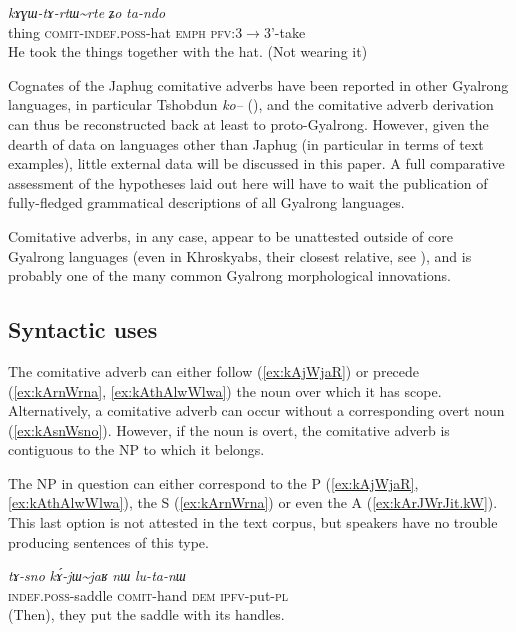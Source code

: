\documentclass[oldfontcommands,oneside,a4paper,11pt]{article}
\newcommand{\ipa}[1]{{\phon\textit{#1}}} %
\newcommand{\tld}{\textasciitilde{}}
\begin{document}
\begin{exe}
\ex \label{ex:kAGWtArtWrte}
\gll  \ipa{laχtɕha} 	\ipa{kɤɣɯ-tɤ-rtɯ\tld{}rte} 	\ipa{ʑo} 	\ipa{ta-ndo}  \\
thing \textsc{comit-indef.poss}-hat \textsc{emph} \textsc{pfv}:3$\rightarrow$3'-take \\
\glt He took the things together with the hat. (Not wearing it)
\end{exe}

Cognates of the Japhug comitative adverbs have been reported in other Gyalrong languages, in particular Tshobdun \ipa{ko--} (\citealt[107]{jackson98morphology}), and the comitative adverb derivation can thus be reconstructed back at least to proto-Gyalrong. However, given the dearth of data on languages other than Japhug (in particular in terms of text examples), little external data will be discussed in this paper. A full comparative assessment of the hypotheses laid out here will have to wait the publication of fully-fledged grammatical descriptions of all Gyalrong languages. 

Comitative adverbs, in any case, appear to be unattested outside of core Gyalrong languages (even in Khroskyabs, their closest relative, see \citealt{lai13affixale}), and is probably one of the many common Gyalrong  morphological innovations.

\subsection{Syntactic uses} 

The comitative adverb can either follow (\ref{ex:kAjWjaR}) or precede (\ref{ex:kArnWrna}, \ref{ex:kAthAlwWlwa}) the noun over which it has scope. Alternatively, a comitative adverb can occur without a corresponding overt noun (\ref{ex:kAsnWsno}). However, if the noun is overt, the comitative adverb is contiguous to the NP to which it belongs. 

The NP in question can either correspond to the P (\ref{ex:kAjWjaR}, \ref{ex:kAthAlwWlwa}), the S (\ref{ex:kArnWrna}) or even the A (\ref{ex:kArJWrJit.kW}). This last option is not attested in the text corpus, but speakers have no trouble producing sentences of this type.

\begin{exe}
\ex \label{ex:kAjWjaR}
\gll
\ipa{tɤ-sno}  	\ipa{kɤ́-jɯ\tld{}jaʁ}  	\ipa{nɯ}  	\ipa{lu-ta-nɯ}  \\
\textsc{indef.poss}-saddle \textsc{comit}-hand \textsc{dem} \textsc{ipfv}-put-\textsc{pl} \\
\glt (Then), they put the saddle with its handles.
\end{exe}
\end{document}
